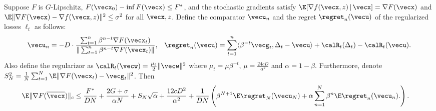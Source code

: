 \begin{theorem}
\label{thm:Exp-O2NC:o2nc-adaptive}
Suppose $F$ is $G$-Lipschitz, $F(\vecx_0)-\inf F(\vecx) \le F^*$, and the stochastic gradients satisfy $\E[\nabla f(\vecx,z)\,|\,\vecx] = \nabla F(\vecx)$ and $\E\|\nabla F(\vecx)-\nabla f(\vecx,z)\|^2\le \sigma^2$ for all $\vecx,z$. Define the comparator $\vecu_n$ and the regret $\regret_n(\vecu)$ of the regularized losses $\ell_t$ as follows:
\begin{align*}
    & \vecu_n = -D \cdot \frac{\sum_{t=1}^n \beta^{n-t}\nabla F(\vecx_t)}{\|\sum_{t=1}^n \beta^{n-t}\nabla F(\vecx_t)\|},
    & \regret_n(\vecu) 
    = \sum_{t=1}^n \langle \beta^{-t}\vecg_t, \Delta_t - \vecu \rangle + \calR_t(\Delta_t) - \calR_t(\vecu).
\end{align*}
Also define the regularizor as $\calR_t(\vecw) = \frac{\mu_t}{2}\|\vecw\|^2$ where $\mu_t = \mu\beta^{-t}$, $\mu=\frac{24cD}{\alpha^2}$ and $\alpha=1-\beta$. Furthermore, denote $S_N^2 = \frac{1}{N}\sum_{t=1}^N \E\|\nabla F(\vecx_t) - \vecg_t\|^2$. Then
\begin{align*}
    \E \|\nabla F(\overline\vecx)\|_c
    &\le \frac{F^*}{DN} + \frac{2G+\sigma}{\alpha N} + S_N\sqrt{\alpha} + \frac{12c D^2}{\alpha^2} 
    + \frac{1}{DN}\left( \beta^{N+1}\E\regret_N(\vecu_N) + \alpha \sum_{n=1}^N \beta^n \E\regret_n(\vecu_n). \right).
\end{align*}
\end{theorem}

